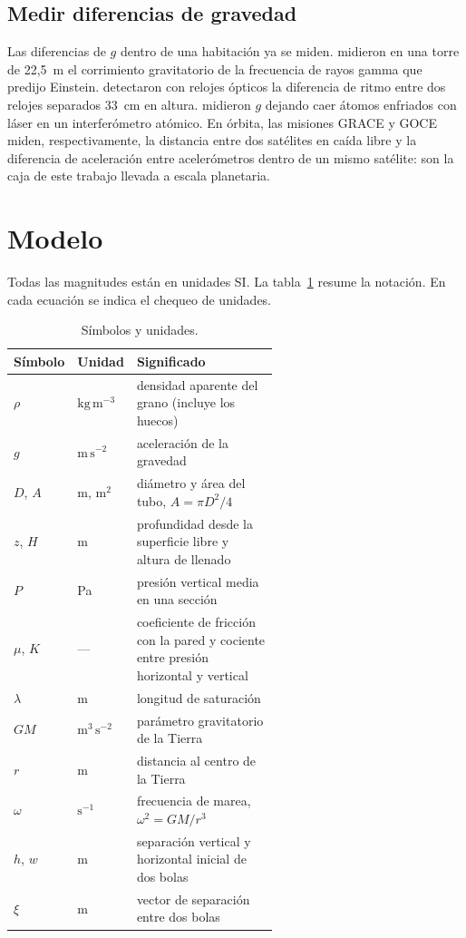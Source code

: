 \documentclass[11pt,a4paper]{article}
\begin{document}
\subsection{Medir diferencias de gravedad}

Las diferencias de $g$ dentro de una habitación ya se miden. \textcite{pound1960} midieron en una torre de 22,5~m el corrimiento gravitatorio de la frecuencia de rayos gamma que predijo Einstein. \textcite{chou2010} detectaron con relojes ópticos la diferencia de ritmo entre dos relojes separados 33~cm en altura. \textcite{peters1999} midieron $g$ dejando caer átomos enfriados con láser en un interferómetro atómico. En órbita, las misiones GRACE \parencite{tapley2004} y GOCE \parencite{drinkwater2003} miden, respectivamente, la distancia entre dos satélites en caída libre y la diferencia de aceleración entre acelerómetros dentro de un mismo satélite: son la caja de este trabajo llevada a escala planetaria.

\section{Modelo}\label{sec:modelo}

Todas las magnitudes están en unidades SI. La tabla~\ref{tab:simbolos} resume la notación. En cada ecuación se indica el chequeo de unidades.

\begin{table}[htbp]
\centering
\small
\caption{Símbolos y unidades.}
\label{tab:simbolos}
\begin{tabular}{@{}llp{0.58\linewidth}@{}}
\toprule
Símbolo & Unidad & Significado \\
\midrule
$\rho$ & $\mathrm{kg\,m^{-3}}$ & densidad aparente del grano (incluye los huecos) \\
$g$ & $\mathrm{m\,s^{-2}}$ & aceleración de la gravedad \\
$D$, $A$ & m, m$^2$ & diámetro y área del tubo, $A = \pi D^2/4$ \\
$z$, $H$ & m & profundidad desde la superficie libre y altura de llenado \\
$P$ & Pa & presión vertical media en una sección \\
$\mu$, $K$ & --- & coeficiente de fricción con la pared y cociente entre presión horizontal y vertical \\
$\lambda$ & m & longitud de saturación \\
$GM$ & $\mathrm{m^3\,s^{-2}}$ & parámetro gravitatorio de la Tierra \\
$r$ & m & distancia al centro de la Tierra \\
$\omega$ & $\mathrm{s^{-1}}$ & frecuencia de marea, $\omega^2 = GM/r^3$ \\
$h$, $w$ & m & separación vertical y horizontal inicial de dos bolas \\
$\xi$ & m & vector de separación entre dos bolas \\
\bottomrule
\end{tabular}
\end{table}
\end{document}
